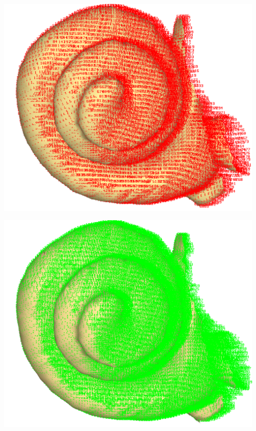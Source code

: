 \noindent
\begin{minipage}{0.45\textwidth}\centering
\includegraphics[scale=0.1]{images/Viewing_options/Vertices_ids.png}

\end{minipage}  
 \begin{minipage}{0.45\textwidth}\centering
\includegraphics[scale=0.1]{images/Viewing_options/Triangle_ids.png}

 \end{minipage} 
\noindent






